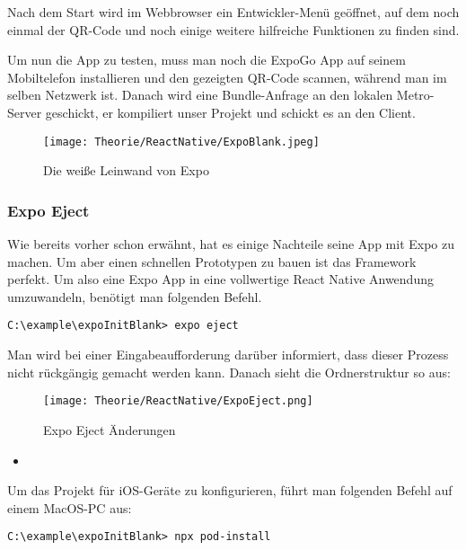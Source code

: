 Nach dem Start wird im Webbrowser ein Entwickler-Menü geöffnet, auf dem noch einmal der QR-Code
und noch einige weitere hilfreiche Funktionen zu finden sind.

Um nun die App zu testen, muss man noch die ExpoGo App auf seinem Mobiltelefon installieren und den
gezeigten QR-Code scannen, während man im selben Netzwerk ist. Danach wird eine Bundle-Anfrage an
den lokalen Metro-Server geschickt, er kompiliert unser Projekt und schickt es an den Client.

\begin{figure}[H]
  \begin{center}
    \texttt{[image: Theorie/ReactNative/ExpoBlank.jpeg]}
    \caption{Die weiße Leinwand von Expo}
  \end{center}
\end{figure}

\subsubsection{Expo Eject}
Wie bereits vorher schon erwähnt, hat es einige Nachteile seine App mit Expo zu machen. Um aber
einen schnellen Prototypen zu bauen ist das Framework perfekt. Um also eine Expo App in eine
vollwertige React Native Anwendung umzuwandeln, benötigt man folgenden Befehl.

\begin{lstlisting}
C:\example\expoInitBlank> expo eject
\end{lstlisting}

Man wird bei einer Eingabeaufforderung darüber informiert, dass dieser Prozess nicht rückgängig
gemacht werden kann. Danach sieht die Ordnerstruktur so aus:

\begin{figure}[H]
  \begin{center}
    \texttt{[image: Theorie/ReactNative/ExpoEject.png]}
    \caption{Expo Eject Änderungen}
  \end{center}
\end{figure}

\begin{itemize}
  \item 
\end{itemize}

Um das Projekt für iOS-Geräte zu konfigurieren, führt man folgenden Befehl auf einem MacOS-PC aus:

\begin{lstlisting}
C:\example\expoInitBlank> npx pod-install
\end{lstlisting}

